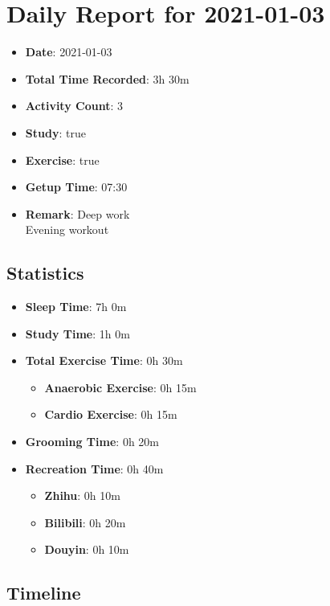 \documentclass[12pt]{extarticle}
\begin{document}
{\fontsize{18}{21.6}\selectfont\section*{Daily Report for 2021-01-03}}

\begin{itemize}[topsep=0pt, itemsep=-0.5ex]
    \item \textbf{Date}: 2021-01-03
    \item \textbf{Total Time Recorded}: 3h 30m
    \item \textbf{Activity Count}: 3
    \item \textbf{Study}: true
    \item \textbf{Exercise}: true
    \item \textbf{Getup Time}: 07:30
    \item \textbf{Remark}: Deep work\\
Evening workout
\end{itemize}

{ \fontsize{16}{19}\selectfont \subsection*{Statistics}}

\begin{itemize}[topsep=0pt, itemsep=-0.5ex]
    \item \textbf{Sleep Time}: 7h 0m
    \item \textbf{Study Time}: 1h 0m
    \item \textbf{Total Exercise Time}: 0h 30m
    \begin{itemize}[topsep=0pt, itemsep=-0.5ex]
        \item \textbf{Anaerobic Exercise}: 0h 15m
        \item \textbf{Cardio Exercise}: 0h 15m
    \end{itemize}
    \item \textbf{Grooming Time}: 0h 20m
    \item \textbf{Recreation Time}: 0h 40m
    \begin{itemize}[topsep=0pt, itemsep=-0.5ex]
        \item \textbf{Zhihu}: 0h 10m
        \item \textbf{Bilibili}: 0h 20m
        \item \textbf{Douyin}: 0h 10m
    \end{itemize}
\end{itemize}

{\fontsize{16}{19.2}\selectfont\subsection*{Timeline}}
\end{document}
